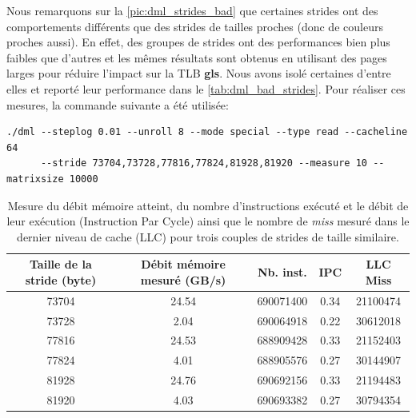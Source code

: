         Nous remarquons sur la \autoref{pic:dml_strides_bad} que certaines \glspl{stride} ont des comportements différents que des strides de tailles proches (donc de couleurs proches aussi). En effet, des groupes de strides ont des performances bien plus faibles que d'autres et les mêmes résultats sont obtenus en utilisant des pages larges pour réduire l'impact sur la TLB \textbf{gls}. Nous avons isolé certaines d'entre elles et reporté leur performance dans le  \autoref{tab:dml_bad_strides}. Pour réaliser ces mesures, la commande suivante a été utilisée: 
        \begin{verbatim}
./dml --steplog 0.01 --unroll 8 --mode special --type read --cacheline 64 
      --stride 73704,73728,77816,77824,81928,81920 --measure 10 --matrixsize 10000
        \end{verbatim}
        
        
        \begin{table}[ht!]
        \centering
        \begin{tabular}{|c|c|c|c|c|}
        \hline
        \rowcolor[HTML]{EFEFEF} 
        Taille de la stride (byte) & Débit mémoire mesuré (GB/s) & Nb. inst. & IPC & LLC Miss \\ \hline
        \rowcolor[HTML]{FFFFC7} 
        73704 & 24.54 & 690071400 & 0.34 & 21100474 \\ \hline
        \rowcolor[HTML]{FFFFC7} 
        73728 & 2.04 & 690064918 & 0.22 & 30612018 \\ \hline
        \rowcolor[HTML]{E8FFFE} 
        77816 & 24.53 & 688909428 & 0.33 & 21152403 \\ \hline
        \rowcolor[HTML]{E8FFFE} 
        77824 & 4.01 & 688905576 & 0.27 & 30144907 \\ \hline
        \rowcolor[HTML]{E6FFE6} 
        81928 & 24.76 & 690692156 & 0.33 & 21194483 \\ \hline
        \rowcolor[HTML]{E6FFE6} 
        81920 & 4.03 & 690693382 & 0.27 & 30794354 \\ \hline
        \end{tabular}%
        \caption{Mesure du débit mémoire atteint, du nombre d'instructions exécuté et le débit de leur exécution (Instruction Par Cycle) ainsi que le nombre de \textit{miss} mesuré dans le dernier niveau de cache (LLC) pour trois couples de strides de taille similaire.}
        \label{tab:dml_bad_strides}
        \end{table}
        
